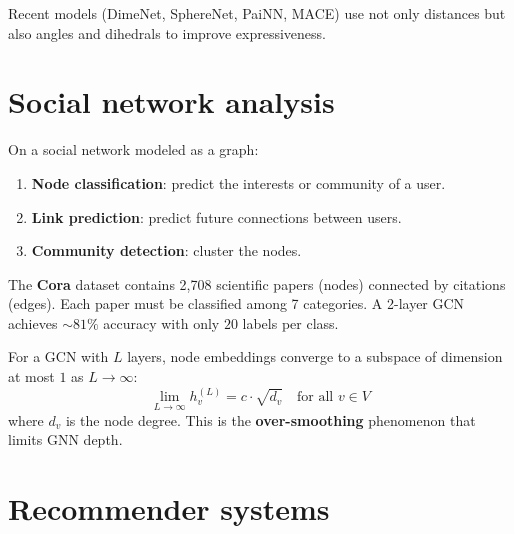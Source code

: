 \begin{remark}
Recent models (DimeNet, SphereNet, PaiNN, MACE) use not only
distances but also angles and dihedrals to improve expressiveness.
\end{remark}

\section{Social network analysis}
\label{sec:social_networks}

\begin{definition}
On a social network modeled as a graph:
\begin{enumerate}
  \item \textbf{Node classification}: predict the interests or
        community of a user.
  \item \textbf{Link prediction}: predict future connections
        between users.
  \item \textbf{Community detection}: cluster the nodes.
\end{enumerate}
\end{definition}

\begin{example}
The \textbf{Cora} dataset contains 2,708 scientific
papers (nodes) connected by citations (edges). Each paper must be
classified among 7 categories. A 2-layer GCN achieves $\sim 81\%$
accuracy with only $20$ labels per class.
\end{example}

\begin{proposition}
For a GCN with $L$ layers, node embeddings converge to a subspace
of dimension at most $1$ as $L \to \infty$:
\[
  \lim_{L \to \infty} h_v^{(L)} = c \cdot \sqrt{d_v} \quad
  \text{for all } v \in V
\]
where $d_v$ is the node degree. This is the \textbf{over-smoothing}
phenomenon that limits GNN depth.
\end{proposition}

\section{Recommender systems}
\label{sec:recommender}

